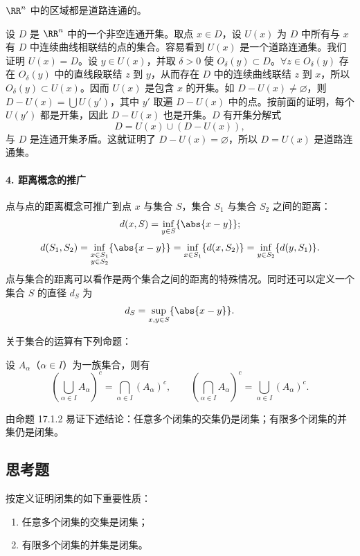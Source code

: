 \begin{xproposition}[17.1.1]
$\RR^n$ 中的区域都是道路连通的。
\end{xproposition}
\begin{xproof}
设 $D$ 是 $\RR^n$ 中的一个非空连通开集。取点 $x\in D$，设 $U(x)$ 为 $D$ 中所有与 $x$ 有 $D$ 中连续曲线相联结的点的集合。容易看到 $U(x)$ 是一个道路连通集。我们证明 $U(x)=D$。设 $y\in U(x)$，并取 $\delta>0$ 使 $O_\delta(y)\subset D$。$\forall z\in O_\delta(y)$ 存在 $O_\delta(y)$ 中的直线段联结 $z$ 到 $y$，从而存在 $D$ 中的连续曲线联结 $z$ 到 $x$，所以 $O_\delta(y)\subset U(x)$。因而 $U(x)$ 是包含 $x$ 的开集。如 $D-U(x)\neq\varnothing$，则 $D-U(x)=\bigcup U(y')$，其中 $y'$ 取遍 $D-U(x)$ 中的点。按前面的证明，每个 $U(y')$ 都是开集，因此 $D-U(x)$ 也是开集。$D$ 有开集分解式
\[
  D=U(x)\cup(D-U(x)),
\]
与 $D$ 是连通开集矛盾。这就证明了 $D-U(x)=\varnothing$，所以 $D=U(x)$ 是道路连通集。
\end{xproof}

\paragraph{4. 距离概念的推广}
点与点的距离概念可推广到点 $x$ 与集合 $S$，集合 $S_1$ 与集合 $S_2$ 之间的距离：
\[
  d(x,S)=\inf_{y\in S}\{\abs{x-y}\};
\]
\[
  d(S_1,S_2)
  =\inf_{\substack{x\in S_1\\y\in S_2}}\{\abs{x-y}\}
  =\inf_{x\in S_1}\{d(x,S_2)\}
  =\inf_{y\in S_2}\{d(y,S_1)\}.
\]
点与集合的距离可以看作是两个集合之间的距离的特殊情况。同时还可以定义一个集合 $S$ 的直径 $d_S$ 为
\[
  d_S=\sup_{x,y\in S}\{\abs{x-y}\}.
\]

关于集合的运算有下列命题：

\begin{xproposition}
设 $A_\alpha$（$\alpha\in I$）为一族集合，则有
\[
  \left(\bigcup_{\alpha\in I}A_\alpha\right)^c
  =\bigcap_{\alpha\in I}(A_\alpha)^c,
  \qquad
  \left(\bigcap_{\alpha\in I}A_\alpha\right)^c
  =\bigcup_{\alpha\in I}(A_\alpha)^c.
\]
\end{xproposition}

由命题 17.1.2 易证下述结论：任意多个闭集的交集仍是闭集；有限多个闭集的并集仍是闭集。

\subsection{思考题}
\begin{xthought}[1]
按定义证明闭集的如下重要性质：
  \begin{enumerate}[label=(\arabic*)]
    \item 任意多个闭集的交集是闭集；
    \item 有限多个闭集的并集是闭集。
  \end{enumerate}
\end{xthought}


